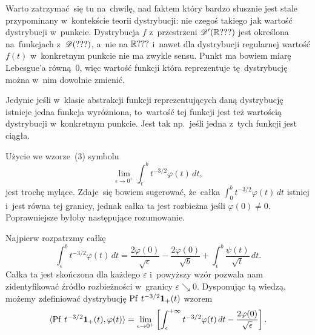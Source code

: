 \documentclass[a4paper,11pt]{article}
\numberwithin{equation}{section}
\begin{document}
\noindent
{} Warto zatrzymać~się tu na~chwilę, nad faktem który
bardzo słusznie jest stale przypominany w~kontekście teorii
dystrybucji: nie czegoś takiego jak wartość dystrybucji w~punkcie.
Dystrybucja $f$ z~przestrzeni $\mathcal{D}'( \mathbb{R} ??? )$ jest określona
na~funkcjach z~$\mathcal{D}( ??? )$, a~nie na $\mathbb{R} ???$ i~nawet dla dystrybucji
regularnej wartość $f( t )$ w~konkretnym punkcie nie ma zwykle sensu.
Punkt ma bowiem miarę Lebesgue’a równą~0, więc wartość funkcji która
reprezentuje tę~dystrybucję można w~nim dowolnie zmienić.

Jedynie jeśli w~klasie abstrakcji funkcji reprezentujących daną
dystrybucję istnieje jedna funkcja wyróżniona, to~wartość tej funkcji
jest też wartością dystrybucji w~konkretnym punkcie. Jest tak
np.~jeśli jedna z~tych funkcji jest ciągła.

\VerSpaceFour





\noindent
{} Użycie we wzorze~(3) symbolu
\begin{equation}
  \label{eq:Zemanian-01}
  \lim_{ \epsilon \to 0^{ + } } \int_{ \epsilon }^{ b } t^{ -3 / 2 } \varphi( t ) \, dt,
\end{equation}
jest trochę mylące. Zdaje~się bowiem sugerować, że~całka
$\int_{ 0 }^{ b } t^{ -3 / 2 } \varphi( t ) \, dt$ istniej i~jest równa tej
granicy, jednak całka ta jest rozbieżna jeśli $\varphi( 0 ) \neq 0$.
Poprawniejsze byłoby następujące rozumowanie.

Najpierw rozpatrzmy całkę
\begin{equation}
  \label{eq:Zemanian-02}
  \int_{ \epsilon }^{ b } t^{ -3/2 } \varphi( t ) \, dt =
  \frac{ 2 \varphi( 0 ) }{ \sqrt{ \epsilon } } - \frac{ 2 \varphi( 0 ) }{ \sqrt{ b } }
  + \int_{ \epsilon }^{ b } \frac{ \psi( t ) }{ \sqrt{ t } } \, dt.
\end{equation}
Całka ta jest skończona dla każdego $\varepsilon$ i~powyższy wzór pozwala
nam zidentyfikować źródło rozbieżności w~granicy $\varepsilon \searrow 0$.
Dysponując tą wiedzą, możemy zdefiniować dystrybucję
$\operatorname{Pf} \, t^{ -3 / 2 } \mathbf{1}_{ + }( t )$ wzorem
\begin{equation}
  \label{eq:Zemanian-03}
  \langle \operatorname{Pf} \, t^{ -3/2 } \mathbf{1}_{ + }( t ), \varphi( t ) \rangle =
  \lim_{ \epsilon \to 0^{ + } } \left[ \int_{ \epsilon }^{ +\infty } t^{ -3/2 } \varphi( t ) \, dt
    - \frac{ 2 \varphi( 0 ) }{ \sqrt{ \epsilon } } \right].
\end{equation}
\end{document}
